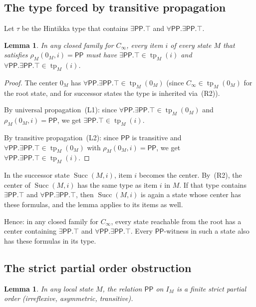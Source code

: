 \documentclass[11pt]{article}
\newtheorem{lemma}[theorem]{Lemma}
\theoremstyle{definition}
\newcommand{\tp}{\operatorname{tp}}
\newcommand{\Pp}{\mathsf{PP}}
\newcommand{\Succ}{\operatorname{Succ}}
\begin{document}
\subsection{The type forced by transitive propagation}

Let $\tau$ be the Hintikka type that contains
$\exists\Pp.\top$ and $\forall\Pp.\exists\Pp.\top$.

\begin{lemma}\label{lem:type-propagation}
In any closed family for $C_\infty$, every item $i$ of every state $M$
that satisfies $\rho_M(0_M,i)=\Pp$ must have
$\exists\Pp.\top\in\tp_M(i)$ and
$\forall\Pp.\exists\Pp.\top\in\tp_M(i)$.
\end{lemma}

\begin{proof}
The center $0_M$ has $\forall\Pp.\exists\Pp.\top\in\tp_M(0_M)$ (since
$C_\infty\in\tp_M(0_M)$ for the root state, and for successor states
the type is inherited via~(R2)).

By universal propagation~(L1): since
$\forall\Pp.\exists\Pp.\top\in\tp_M(0_M)$ and $\rho_M(0_M,i)=\Pp$,
we get $\exists\Pp.\top\in\tp_M(i)$.

By transitive propagation~(L2): since $\Pp$ is transitive and
$\forall\Pp.\exists\Pp.\top\in\tp_M(0_M)$ with $\rho_M(0_M,i)=\Pp$,
we get $\forall\Pp.\exists\Pp.\top\in\tp_M(i)$.
\end{proof}

In the successor state $\Succ(M,i)$, item $i$ becomes the center.
By~(R2), the center of $\Succ(M,i)$ has the same type as item $i$ in
$M$.  If that type contains $\exists\Pp.\top$ and
$\forall\Pp.\exists\Pp.\top$, then $\Succ(M,i)$ is again a state
whose center has these formulas, and the lemma applies to its items as
well.

Hence: in any closed family for $C_\infty$, every state reachable from
the root has a center containing $\exists\Pp.\top$ and
$\forall\Pp.\exists\Pp.\top$.  Every $\Pp$-witness in such a state
also has these formulas in its type.

\subsection{The strict partial order obstruction}

\begin{lemma}\label{lem:spo}
In any local state $M$, the relation $\Pp$ on $I_M$ is a finite
strict partial order (irreflexive, asymmetric, transitive).
\end{lemma}
\end{document}
